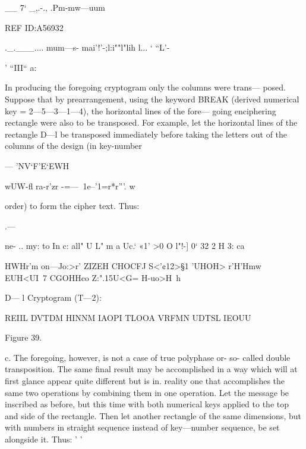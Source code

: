 { 

__ 7‘ _,.-., .Pm-mw—uum

REF ID:A56932

._.___.... mum—s- mai'!'-;l:i""l"lih l... ‘ “L'-

' “III“ a:

In producing the foregoing cryptogram only the columns were trans—
posed. Suppose that by prearrangement, using the keyword BREAK
(derived numerical key = 2—5—3—1—4), the horizontal lines of the fore—
going enciphering rectangle were also to be transposed. For example,
let the horizontal lines of the rectangle D—l be transposed immediately
before taking the letters out of the columns of the design (in key-number

--- 'NV‘F’E‘EWH

wUW-ﬂ ra-r'zr -=—~1e--'1=r*r”'. w

 

order) to form the cipher text. Thus:

.—

 

 

 

 

 

 

ne- .. my: to
In c: all" U
L" m a Uc.‘ «1'
>0 O l"!-] 0‘
32 2 H 3: ca

 

HWHr'm
on—Jo:>r'
ZIZEH
CHOCFJ
S<'¢12>§1
’UHOH>
r'H'Hmw
EUH<UI~7
CGOHHco
Z:".15U<G=
H-uo>H~h

 

 

 

 

 

 

 

 

 

 

 

 

 

 

 

 

 

D— l
Cryptogram (T—2):

REIIL DVTDM HINNM IAOPI TLOOA VRFMN
UDTSL IEOUU

Figure 39.

c. The foregoing, however, is not a case of true polyphase or- so-
called double transposition. The same ﬁnal result may be accomplished
in a way which will at ﬁrst glance appear quite different but is in.
reality one that accomplishes the same two operations by combining
them in one operation. Let the message be inscribed as before, but this
time with both numerical keys applied to the top and side of the
rectangle. Then let another rectangle of the same dimensions, but with
numbers in straight sequence instead of key—number sequence, be set
alongside it. Thus: ' '

}
